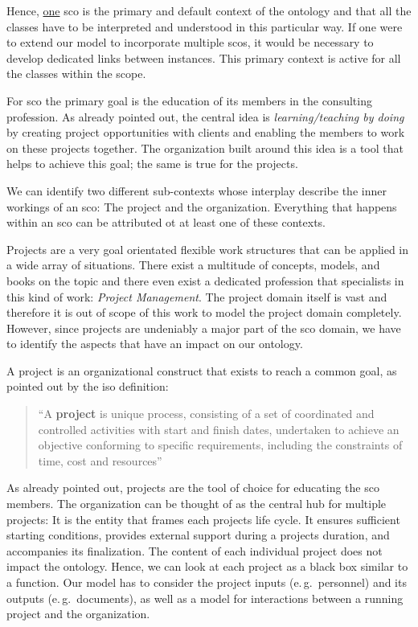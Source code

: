 \documentclass[a4paper, DIV=13, BCOR=0cm]{scrbook}
\newcommand{\eg}{e.\,g.\ }
\begin{document}
Hence, \underline{one} \gls{sco} is the primary and default context of the ontology and that all the classes have to be interpreted and understood in this particular way. If one were to extend our model to incorporate multiple \glspl{sco}, it would be necessary to develop dedicated links between instances. This primary context is active for all the classes within the scope.

For \gls{sco} the primary goal is the education of its members in the consulting profession. As already pointed out, the central idea is \textit{learning/teaching by doing} by creating project opportunities with clients and enabling the members to work on these projects together. The organization built around this idea is a tool that helps to achieve this goal; the same is true for the projects.

We can identify two different sub-contexts whose interplay describe the inner workings of an \gls{sco}: The project and the organization. Everything that happens within an \gls{sco} can be attributed ot at least one of these contexts.

Projects are a very goal orientated flexible work structures that can be applied in a wide array of situations. There exist a multitude of concepts, models, and books on the topic and there even exist a dedicated profession that specialists in this kind of work: \textit{Project Management}. The project domain itself is vast and therefore it is out of scope of this work to model the project domain completely. However, since projects are undeniably a major part of the \gls{sco} domain, we have to identify the aspects that have an impact on our ontology. 

A project is an organizational construct that exists to reach a common goal, as pointed out by the \gls{iso} definition:

\begin{quote}
	\enquote{A \textbf{project} is unique process, consisting of a set of coordinated and controlled activities with start and finish dates, undertaken to achieve an objective conforming to specific requirements, including the constraints of time, cost and resources} \cite{iso-9000-2015}
\end{quote}

As already pointed out, projects are the tool of choice for educating the \gls{sco} members. The organization can be thought of as the central hub for multiple projects: It is the entity that frames each projects life cycle. It ensures sufficient starting conditions, provides external support during a projects duration, and accompanies its finalization. The content of each individual project does not impact the ontology. Hence, we can look at each project as a black box similar to a function. Our model has to consider the project inputs (\eg personnel) and its outputs (\eg documents), as well as a model for interactions between a running project and the organization.
\end{document}
